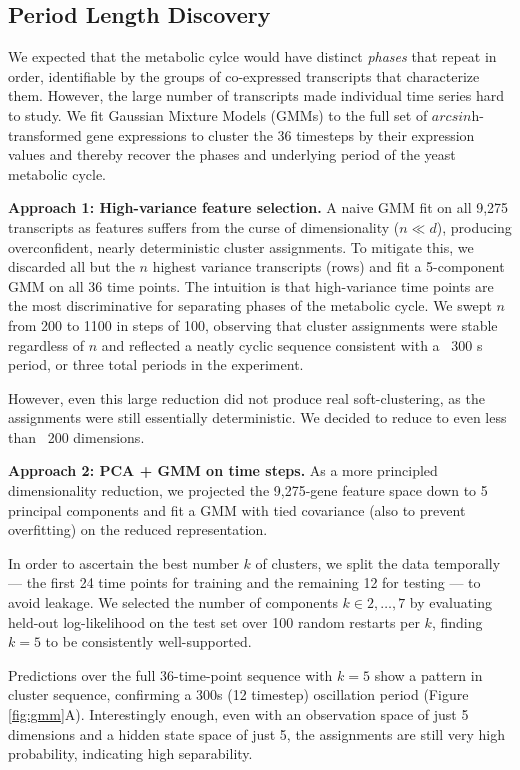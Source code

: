 \documentclass[11pt]{amsart}
\begin{document}
\subsection{Period Length Discovery}

We expected that the metabolic cylce would have distinct \textit{phases} that repeat in order, identifiable by the groups of co-expressed transcripts that characterize them. However, the large number of transcripts made individual time series hard to study. We fit Gaussian Mixture Models (GMMs) to the full set of $\textit{arcsinh}$-transformed gene expressions to cluster the 36 timesteps by their expression values and thereby recover the phases and underlying period of the yeast metabolic cycle.

\textbf{Approach 1: High-variance feature selection.} A naive GMM fit on all 9,275 transcripts as features suffers from the curse of dimensionality ($n \ll d$), producing overconfident, nearly deterministic cluster assignments. To mitigate this, we discarded all but the $n$ highest variance transcripts (rows) and fit a 5-component GMM on all 36 time points. The intuition is that high-variance time points are the most discriminative for separating phases of the metabolic cycle. We swept $n$ from 200 to 1100 in steps of 100, observing that cluster assignments were stable regardless of $n$ and reflected a neatly cyclic sequence consistent with a ~300 s period, or three total periods in the experiment.

However, even this large reduction did not produce real soft-clustering, as the assignments were still essentially deterministic. We decided to reduce to even less than ~200 dimensions.

\textbf{Approach 2: PCA + GMM on time steps.} As a more principled dimensionality reduction, we projected the 9,275-gene feature space down to 5 principal components and fit a GMM with tied covariance (also to prevent overfitting) on the reduced representation. 

In order to ascertain the best number $k$ of clusters, we split the data temporally — the first 24 time points for training and the remaining 12 for testing — to avoid leakage. We selected the number of components $k \in {2, \ldots, 7}$ by evaluating held-out log-likelihood on the test set over 100 random restarts per $k$, finding $k = 5$ to be consistently well-supported. 

Predictions over the full 36-time-point sequence with $k=5$ show a pattern in cluster sequence, confirming a 300s (12 timestep) oscillation period (Figure \ref{fig:gmm}A). Interestingly enough, even with an observation space of just 5 dimensions and a hidden state space of just 5, the assignments are still very high probability, indicating high separability.
\end{document}
